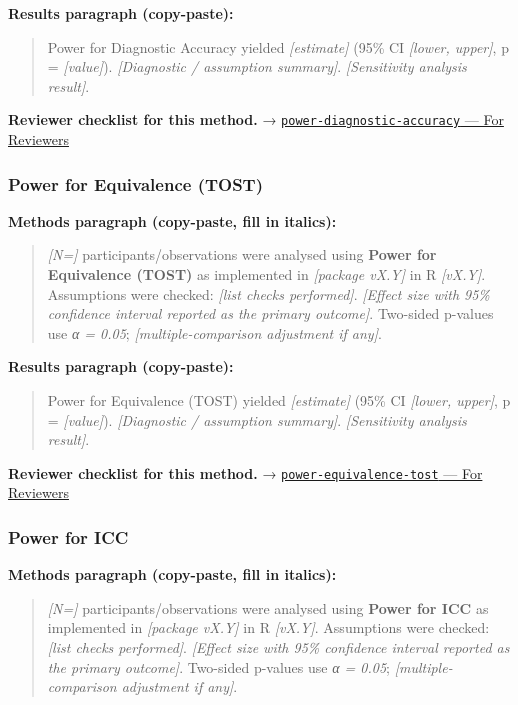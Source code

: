 \documentclass[
]{article}
\begin{document}
\textbf{Results paragraph (copy-paste):}

\begin{quote}
Power for Diagnostic Accuracy yielded \emph{{[}estimate{]}} (95\% CI
\emph{{[}lower, upper{]}}, p = \emph{{[}value{]}}). \emph{{[}Diagnostic
/ assumption summary{]}}. \emph{{[}Sensitivity analysis result{]}}.
\end{quote}

\textbf{Reviewer checklist for this method.} →
\href{../chapters/05-power/power-diagnostic-accuracy.Rmd\#for-reviewers}{\texttt{power-diagnostic-accuracy}
--- For Reviewers}

\subsubsection{Power for Equivalence
(TOST)}\label{power-for-equivalence-tost}

\textbf{Methods paragraph (copy-paste, fill in italics):}

\begin{quote}
\emph{{[}N={]}} participants/observations were analysed using
\textbf{Power for Equivalence (TOST)} as implemented in \emph{{[}package
vX.Y{]}} in R \emph{{[}vX.Y{]}}. Assumptions were checked: \emph{{[}list
checks performed{]}}. \emph{{[}Effect size with 95\% confidence interval
reported as the primary outcome{]}}. Two-sided p-values use \emph{α =
0.05}; \emph{{[}multiple-comparison adjustment if any{]}}.
\end{quote}

\textbf{Results paragraph (copy-paste):}

\begin{quote}
Power for Equivalence (TOST) yielded \emph{{[}estimate{]}} (95\% CI
\emph{{[}lower, upper{]}}, p = \emph{{[}value{]}}). \emph{{[}Diagnostic
/ assumption summary{]}}. \emph{{[}Sensitivity analysis result{]}}.
\end{quote}

\textbf{Reviewer checklist for this method.} →
\href{../chapters/05-power/power-equivalence-tost.Rmd\#for-reviewers}{\texttt{power-equivalence-tost}
--- For Reviewers}

\subsubsection{Power for ICC}\label{power-for-icc}

\textbf{Methods paragraph (copy-paste, fill in italics):}

\begin{quote}
\emph{{[}N={]}} participants/observations were analysed using
\textbf{Power for ICC} as implemented in \emph{{[}package vX.Y{]}} in R
\emph{{[}vX.Y{]}}. Assumptions were checked: \emph{{[}list checks
performed{]}}. \emph{{[}Effect size with 95\% confidence interval
reported as the primary outcome{]}}. Two-sided p-values use \emph{α =
0.05}; \emph{{[}multiple-comparison adjustment if any{]}}.
\end{quote}
\end{document}
